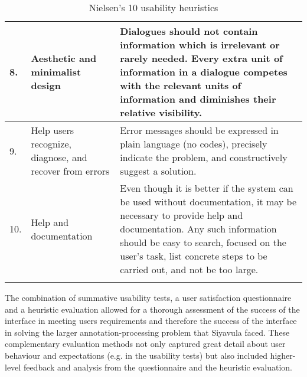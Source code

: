 \begin{longtable}{|p{0.4cm} | p{5cm}|p{8cm}|}
8.&Aesthetic and minimalist design & Dialogues should not contain information which is irrelevant or rarely needed. Every extra unit of information in a dialogue competes with the relevant units of information and diminishes their relative visibility.\\ \hline

9.& Help users recognize, diagnose, and recover from errors & Error messages should be expressed in plain language (no codes), precisely indicate the problem, and constructively suggest a solution.\\ \hline

10.& Help and documentation & Even though it is better if the system can be used without documentation, it may be necessary to provide help and documentation. Any such information should be easy to search, focused on the user's task, list concrete steps to be carried out, and not be too large. \\
\hline

\caption{Nielsen's 10 usability heuristics}
\label{table:heuristics}
\end{longtable}

The combination of summative usability tests, a user satisfaction questionnaire and a heuristic evaluation allowed for a thorough assessment of the success of the interface in meeting users requirements and therefore the success of the interface in solving the larger annotation-processing problem that Siyavula faced. These complementary evaluation methods not only captured great detail about user behaviour and expectations (e.g. in the usability tests) but also included higher-level feedback and analysis from the questionnaire and the heuristic evaluation.
